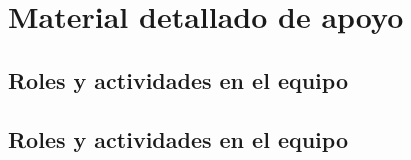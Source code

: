 \chapter{Material detallado de apoyo}

\section{Roles y actividades en el equipo} %

\section{Roles y actividades en el equipo} %
